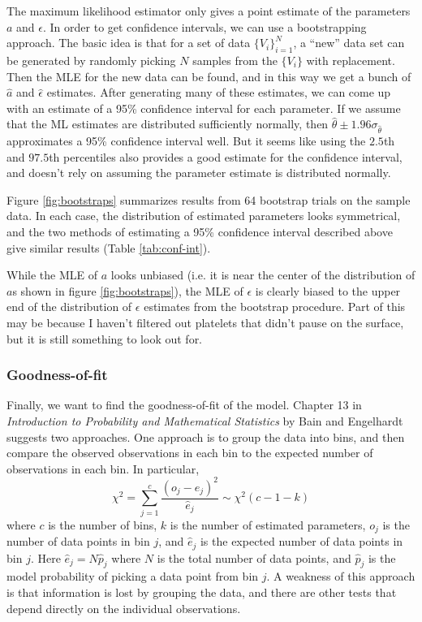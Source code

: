 The maximum likelihood estimator only gives a point estimate of the
parameters $a$ and $\epsilon$. In order to get confidence intervals,
we can use a bootstrapping approach. The basic idea is that for a set
of data $\{V_i\}_{i=1}^N$, a ``new'' data set can be generated by
randomly picking $N$ samples from the $\{V_i\}$ with replacement. Then
the MLE for the new data can be found, and in this way we get a bunch
of $\hat{a}$ and $\hat{\epsilon}$ estimates. After generating many of
these estimates, we can come up with an estimate of a 95\% confidence
interval for each parameter. If we assume that the ML estimates are
distributed sufficiently normally, then
$\hat{\theta} \pm 1.96 \sigma_{\hat{\theta}}$ approximates a 95\%
confidence interval well. But it seems like using the $2.5$th and
$97.5$th percentiles also provides a good estimate for the confidence
interval, and doesn't rely on assuming the parameter estimate is
distributed normally.

Figure \ref{fig:bootstraps} summarizes results from 64 bootstrap
trials on the sample data. In each case, the distribution of estimated
parameters looks symmetrical, and the two methods of estimating a 95\%
confidence interval described above give similar results (Table
\ref{tab:conf-int}).

While the MLE of $a$ looks unbiased (i.e. it is near the center of the
distribution of $a$s shown in figure \ref{fig:bootstraps}), the MLE of
$\epsilon$ is clearly biased to the upper end of the distribution of
$\epsilon$ estimates from the bootstrap procedure. Part of this may be
because I haven't filtered out platelets that didn't pause on the
surface, but it is still something to look out for. 

\subsubsection{Goodness-of-fit}
\label{sec:goodness-fit}

Finally, we want to find the goodness-of-fit of the model. Chapter 13
in \textit{Introduction to Probability and Mathematical Statistics} by
Bain and Engelhardt suggests two approaches. One approach is to group
the data into bins, and then compare the observed observations in each
bin to the expected number of observations in each bin. In particular,
\begin{equation}
  \label{eq:chi2}
  \chi^2 = \sum_{j=1}^c \frac{(o_j - \hat{e}_j)^2}{\hat{e}_j} \sim
  \chi^2(c - 1 - k)
\end{equation}
where $c$ is the number of bins, $k$ is the number of estimated
parameters, $o_j$ is the number of data points in bin $j$, and
$\hat{e}_j$ is the expected number of data points in bin $j$. Here
$\hat{e}_j = N \hat{p}_j$ where $N$ is the total number of data
points, and $\hat{p}_j$ is the model probability of picking a data
point from bin $j$. A weakness of this approach is that information is
lost by grouping the data, and there are other tests that depend
directly on the individual observations.

